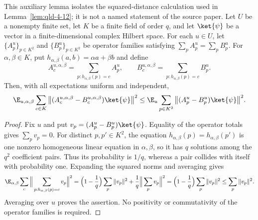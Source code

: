 \begin{lemma}
	\label{lem:qld-affine-distance-contraction}
	\leanok
	This auxiliary lemma isolates the squared-distance calculation used in
	Lemma~\ref{lem:qld-4-12}; it is not a named statement of the source paper.
	Let $U$ be a nonempty finite set, let $K$ be a finite field of order $q$,
	and let $\ket{\psi}$ be a vector in a finite-dimensional complex Hilbert
	space. For each $u\in U$, let $\{A^u_p\}_{p\in K^2}$ and
	$\{B^u_p\}_{p\in K^2}$ be operator families satisfying
	$\sum_p A^u_p=\sum_p B^u_p$. For $\alpha,\beta\in K$, put
	$h_{\alpha,\beta}(a,b)=\alpha a+\beta b$ and define
	\[
		A^{u,\alpha,\beta}_c=\sum_{p:h_{\alpha,\beta}(p)=c}A^u_p,
		\qquad
		B^{u,\alpha,\beta}_c=\sum_{p:h_{\alpha,\beta}(p)=c}B^u_p.
	\]
	Then, with all expectations uniform and independent,
	\[
		\E_{u,\alpha,\beta}\sum_{c\in K}
		\big\|(A^{u,\alpha,\beta}_c-B^{u,\alpha,\beta}_c)\ket{\psi}\big\|^2
		\le
		\E_u\sum_{p\in K^2}\big\|(A^u_p-B^u_p)\ket{\psi}\big\|^2.
	\]
\end{lemma}
\begin{proof}
	\leanok
	Fix $u$ and put $v_p=(A^u_p-B^u_p)\ket{\psi}$. Equality of the
	operator totals gives $\sum_p v_p=0$. For distinct $p,p'\in K^2$,
	the equation $h_{\alpha,\beta}(p)=h_{\alpha,\beta}(p')$ is one
	nonzero homogeneous linear equation in $\alpha,\beta$, so it has $q$
	solutions among the $q^2$ coefficient pairs. Thus its probability is
	$1/q$, whereas a pair collides with itself with probability one.
	Expanding the squared norms and averaging gives
	\[
		\E_{\alpha,\beta}\sum_c
		\Big\|\sum_{p:h_{\alpha,\beta}(p)=c}v_p\Big\|^2
		=\Big(1-\frac1q\Big)\sum_p\|v_p\|^2
		 +\frac1q\Big\|\sum_p v_p\Big\|^2
		=\Big(1-\frac1q\Big)\sum_p\|v_p\|^2
		\le\sum_p\|v_p\|^2.
	\]
	Averaging over $u$ proves the assertion. No positivity or commutativity
	of the operator families is required.
\end{proof}

